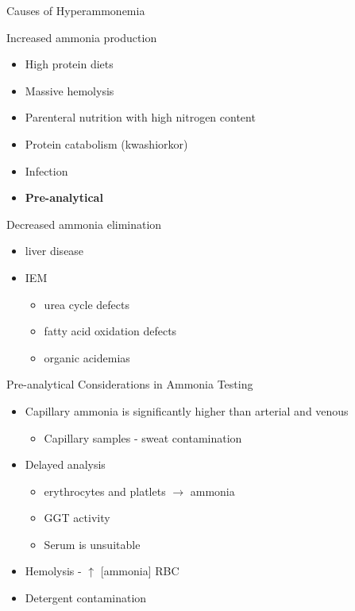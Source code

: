 \documentclass[presentation, smaller]{beamer}
\begin{document}
\begin{frame}[label={sec:orgheadline13}]{Causes of Hyperammonemia}
\begin{block}{Increased ammonia production}
\begin{itemize}
\item High protein diets
\item Massive hemolysis
\item Parenteral nutrition with high nitrogen content
\item Protein catabolism (kwashiorkor)
\item Infection
\item \textbf{Pre-analytical}
\end{itemize}
\end{block}

\begin{block}{Decreased ammonia elimination}
\begin{itemize}
\item liver disease
\item IEM
\begin{itemize}
\item urea cycle defects
\item fatty acid oxidation defects
\item organic acidemias
\end{itemize}
\end{itemize}
\end{block}
\end{frame}

\begin{frame}[label={sec:orgheadline14}]{Pre-analytical Considerations in Ammonia Testing}
\begin{itemize}
\item Capillary ammonia is significantly higher than arterial and venous
\begin{itemize}
\item Capillary samples - sweat contamination
\end{itemize}
\item Delayed analysis
\begin{itemize}
\item erythrocytes and platlets \(\to\) ammonia
\item GGT activity
\item Serum is unsuitable
\end{itemize}
\item Hemolysis -  \(\uparrow\) [ammonia] RBC
\item Detergent contamination
\end{itemize}
\end{frame}
\end{document}
